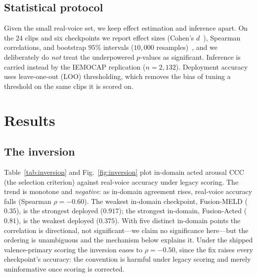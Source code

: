 \documentclass[conference]{IEEEtran}
\begin{document}
\subsection{Statistical protocol}
Given the small real-voice set, we keep effect estimation and inference apart. On
the $24$ clips and six checkpoints we report effect sizes (Cohen's
$d$~\cite{cohen1988}), Spearman correlations, and bootstrap $95\%$ intervals
($10{,}000$ resamples)~\cite{efron1993}, and we deliberately do \emph{not} treat
the underpowered $p$-values as significant. Inference is carried instead by the
IEMOCAP replication ($n = 2{,}132$). Deployment accuracy uses leave-one-out (LOO)
thresholding, which removes the bias of tuning a threshold on the same clips it is
scored on.

\section{Results}

\subsection{The inversion}
Table~\ref{tab:inversion} and Fig.~\ref{fig:inversion} plot in-domain acted arousal
CCC (the selection criterion) against real-voice accuracy under legacy scoring. The
trend is monotone and \emph{negative}: as in-domain agreement rises, real-voice
accuracy falls (Spearman $\rho = -0.60$). The weakest in-domain checkpoint,
Fusion-MELD ($0.35$), is the strongest deployed ($0.917$); the strongest in-domain,
Fusion-Acted ($0.81$), is the weakest deployed ($0.375$). With five distinct
in-domain points the correlation is directional, not significant---we claim no
significance here---but the ordering is unambiguous and the mechanism below
explains it. Under the shipped valence-primary scoring the inversion eases to
$\rho = -0.50$, since the fix raises every checkpoint's accuracy: the convention is
harmful under legacy scoring and merely uninformative once scoring is corrected.

\begin{table}[t]
\caption{The inversion: in-domain acted arousal CCC versus real-voice accuracy
(legacy scoring, $n=24$). Higher in-domain score $\to$ lower deployed accuracy.}
\label{tab:inversion}
\centering
\setlength{\tabcolsep}{5pt}
\renewcommand{\arraystretch}{1.2}
\end{table}
\end{document}
